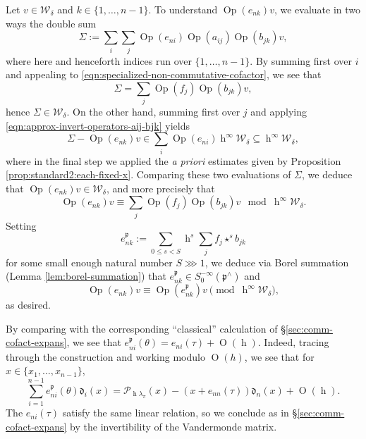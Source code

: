 \documentclass[reqno]{amsart}
\DeclareMathOperator{\h}{h}
\def\O{\operatorname{O}}
\DeclareMathOperator{\Opp}{Op}
\theoremstyle{plain} \newtheorem{theorem} {Theorem}
\theoremstyle{definition} \newtheorem{definition} [theorem] {Definition}
\theoremstyle{itplain} %
\numberwithin{equation}{section}
\numberwithin{theorem}{section}
\renewcommand{\leq}{\leqslant}
\begin{document}
Let $v \in \mathcal{W}_\delta$ and $k \in \{1, \dotsc, n-1\}$.  To understand $\Opp(e_{n k}) v$, we evaluate in two ways the double sum
\begin{equation*}
  \Sigma := 
  \sum_{i}
  \sum_{j}
  \Opp(e_{n i})
  \Opp(a_{i j})
  \Opp(b_{j k})
  v,
\end{equation*}
where here and henceforth indices run over $\{1, \dotsc, n-1\}$.  By summing first over $i$ and appealing to \eqref{eqn:specialized-non-commutative-cofactor}, we see that
\[
  \Sigma = \sum_j \Opp(f_j) \Opp(b_{j k}) v,
\]
hence $\Sigma \in \mathcal{W}_\delta$.  On the other hand, summing first over $j$ and applying \eqref{eqn:approx-invert-operators-aij-bjk} yields
\begin{equation*}
  \Sigma -
  \Opp(e_{n k})
  v
  \in
  \sum_{i} \Opp(e_{n i})
  \h^\infty \mathcal{W}_\delta
  \subseteq \h^\infty \mathcal{W}_\delta,
\end{equation*}
where in the final step we applied the \emph{a priori} estimates given by Proposition \ref{prop:standard2:each-fixed-x}.
Comparing these two evaluations of $\Sigma$, we deduce that $\Opp(e_{n k}) v \in \mathcal{W}_\delta$, and more precisely that
\[
  \Opp(e_{n k}) v \equiv \sum_{j} \Opp(f_j) \Opp(b_{j k}) v \mod{\h^\infty \mathcal{W}_\delta}.
\]
Setting
\[
  e_{n k}^{\mathfrak{p}} := \sum_{0 \leq s < S} \h^s \sum_j f_j \star^s b_{j k}
\]
for some small enough natural number $S \ggg 1$, we deduce via Borel summation (Lemma \ref{lem:borel-summation}) that $e_{n k} ^{\mathfrak{p}} \in S^{-\infty}_0(\mathfrak{p}^\wedge)$ and
\begin{equation*}
\Opp(e_{n k}) v \equiv \Opp(e_{n k}^{\mathfrak{p}}) v \pmod{\h^\infty \mathcal{W}_\delta},
\end{equation*}
as desired.

By comparing with the corresponding ``classical'' calculation of \S\ref{sec:comm-cofact-expans}, we see that $e_{n i}^{\mathfrak{p}}(\theta) = e_{n i}(\tau) + \O(\h)$.  Indeed, tracing through the construction and working modulo $\O(h)$, we see that for $x \in \{x_1,\dotsc,x_{n-1}\}$,
\[
  \sum _{i=1}^{n-1} e_{n i }^{\mathfrak{p}}(\theta) \mathfrak{d}_i(x) = \mathcal{P}_{\h \lambda_\pi}(x) - (x + e_{n n}(\tau)) \mathfrak{d}_n(x) + \O(\h).
\]
The $e_{n i}(\tau)$ satisfy the same linear relation, so we conclude as in \S\ref{sec:comm-cofact-expans} by the invertibility of the Vandermonde matrix.
\end{document}
